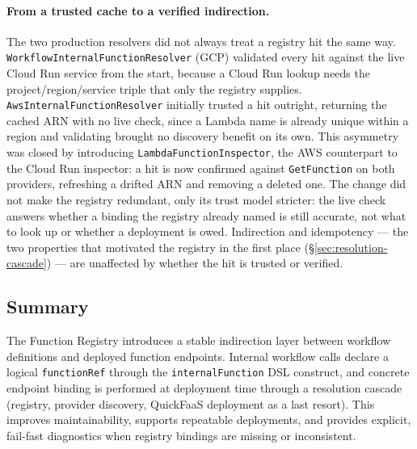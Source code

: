 \paragraph{From a trusted cache to a verified indirection.}
The two production resolvers did not always treat a registry hit the same way.
\texttt{Workflow\allowbreak Internal\allowbreak Function\allowbreak Resolver} (GCP) validated every hit against the live
Cloud Run service from the start, because a Cloud Run lookup needs the project/region/service
triple that only the registry supplies. \texttt{Aws\allowbreak Internal\allowbreak Function\allowbreak Resolver} initially
trusted a hit outright, returning the cached ARN with no live check, since a Lambda name is
already unique within a region and validating brought no discovery benefit on its own. This
asymmetry was closed by introducing \texttt{Lambda\allowbreak Function\allowbreak Inspector}, the AWS counterpart to
the Cloud Run inspector: a hit is now confirmed against \texttt{GetFunction} on both providers,
refreshing a drifted ARN and removing a deleted one. The change did not make the registry
redundant, only its trust model stricter: the live check answers whether a binding the registry
already named is still accurate, not what to look up or whether a deployment is owed. Indirection
and idempotency --- the two properties that motivated the registry in the first place
(\S\ref{sec:resolution-cascade}) --- are unaffected by whether the hit is trusted or verified.

\subsection{Summary}
The Function Registry introduces a stable indirection layer between workflow definitions and deployed function endpoints. Internal workflow calls declare a logical \texttt{functionRef} through the
\texttt{internalFunction} DSL construct, and concrete endpoint binding is performed at
deployment time through a resolution cascade (registry, provider discovery, QuickFaaS
deployment as a last resort). This improves maintainability, supports repeatable deployments, and provides explicit, fail-fast diagnostics when registry bindings are missing or inconsistent.

